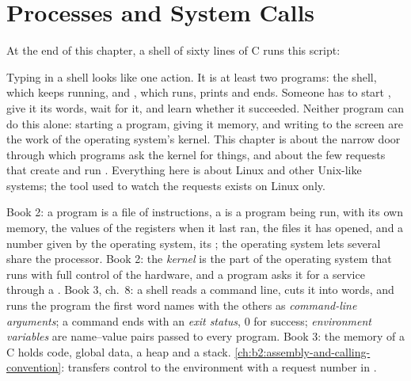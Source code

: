\chapter{Processes and System Calls}\label{ch:b2:processes-and-system-calls}

At the end of this chapter, a shell of sixty lines of C runs this script:

\label{out:b2:processes-and-system-calls:hook}

Typing  in a shell looks like one action. It is at least two programs: the
shell, which keeps running, and , which runs, prints and ends. Someone has to start , give it its
words, wait for it, and learn whether it succeeded. Neither program can do this alone: starting a program, giving it
memory, and writing to the screen are the work of the operating system's kernel. This chapter is about the narrow
door through which programs ask the kernel for things, and about the few requests that create and run .
Everything here is about Linux and other Unix-like systems; the tool  used to watch the requests exists
on Linux only.

\begin{recall}
Book 2: a program is a file of instructions, a \emph{} is a program being run, with its own memory, the
values of the registers when it last ran, the files it has opened, and a number given by the operating system, its
\emph{}; the operating system lets several  share the processor. Book 2: the
\emph{kernel} is the part of the operating system that runs with full control of the hardware, and a program asks it
for a service through a \emph{}. Book 3, ch.~8: a shell reads a command line, cuts it into
words, and runs the program the first word names with the others as \emph{command-line arguments}; a command ends
with an \emph{exit status}, 0 for success; \emph{environment variables} are name--value pairs passed to every
program. Book 3: the memory of a C  holds code, global data, a heap and a stack.
\cref{ch:b2:assembly-and-calling-convention}:  transfers control to the environment with a request
number in .
\end{recall}

